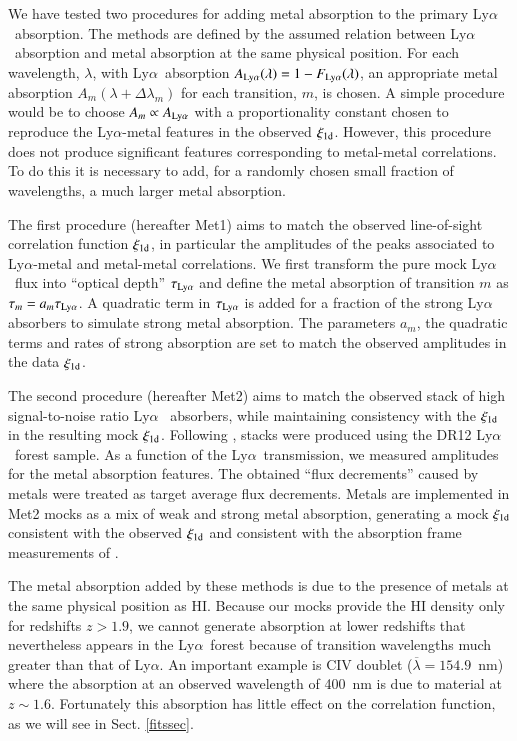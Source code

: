 \documentclass{aa}
\newcommand{\xionedim}{\xi_{\rm 1d}}
\newcommand{\lya}{Ly$\alpha$}
\newcommand{\Lya}{Ly$\alpha$~}
\begin{document}
We have tested two procedures for adding metal absorption
to the primary \Lya absorption.
The methods are defined by the assumed relation between
\Lya absorption and metal absorption at the same physical position.
For each wavelength, $\lambda$, with \Lya absorption
$A_{\rm Ly\alpha}(\lambda)=1-F_{\rm Ly\alpha}(\lambda)$,
an appropriate metal absorption $A_m(\lambda+\Delta\lambda_m)$
for each transition, $m$, is chosen.
A simple procedure would be
to choose $A_m\propto A_{\rm Ly\alpha}$ with a proportionality
constant chosen to reproduce the \lya-metal features
in the observed $\xionedim$.
However, this procedure does not produce significant 
features corresponding to metal-metal correlations.
To do this it is necessary to add, for a randomly chosen small fraction of
wavelengths, a much larger metal absorption.

The first procedure (hereafter Met1) 
aims to match the observed line-of-sight correlation function $\xionedim$,
in particular the amplitudes of the peaks associated 
to \lya-metal and metal-metal correlations.
We first transform the pure mock \Lya flux into ``optical depth'' 
$\tau_{\rm Ly\alpha}$ and define the metal absorption of transition $m$ 
as $\tau_m = a_m \tau_{\rm Ly\alpha}$. 
A quadratic term in 
$\tau_{\rm Ly\alpha}$ 
is added for a fraction of the strong \Lya
absorbers to simulate strong metal absorption. 
The parameters $a_m$, the quadratic terms and rates of strong absorption are 
set to match the observed amplitudes in the data $\xionedim$. 



The second procedure (hereafter Met2)
aims to match the observed stack of high signal-to-noise ratio \Lya
absorbers, while maintaining consistency with the $\xionedim$
in the resulting mock $\xionedim$.
Following \citet{2014MNRAS.441.1718P},
stacks were produced using the DR12 \Lya forest sample.
As a function of the \Lya transmission,
we measured amplitudes for the metal absorption features.
The obtained “flux decrements” caused by metals were treated as
target average flux decrements. Metals are implemented in
Met2 mocks as a mix of weak and strong metal absorption,
generating a mock $\xionedim$ consistent with the observed
$\xionedim$ and  consistent with the absorption frame measurements of
\citet{2014MNRAS.441.1718P}.


The metal absorption added by these methods is due to the
presence of metals at
the same physical position as HI.
Because our mocks provide the HI density only for redshifts $z>1.9$,
we cannot generate absorption at lower redshifts that
nevertheless
appears in the \Lya forest because of
transition wavelengths much greater than that of \lya.
An important example is
CIV doublet ($\overline\lambda=154.9$~nm) where the absorption at an observed wavelength of 400~nm is
due to material at $z\sim1.6$.
  Fortunately this absorption has little effect on the
  correlation function, as we will see in Sect. \ref{fitssec}.
\end{document}
